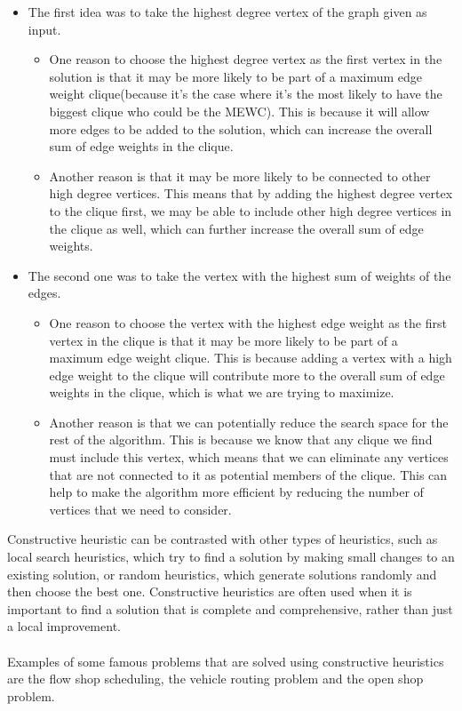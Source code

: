     \begin{itemize}
        \item The first idea was to take the highest degree vertex of the graph given as input. 
        \begin{itemize}
            \item One reason to choose the highest degree vertex as the first vertex in the solution is that it may be more likely to be part of a maximum edge weight clique(because it's the case where it's the most likely to have the biggest clique who could be the MEWC). This is because it will allow more edges to be added to the solution, which can increase the overall sum of edge weights in the clique.
            \item Another reason is that it may be more likely to be connected to other high degree vertices. This means that by adding the highest degree vertex to the clique first, we may be able to include other high degree vertices in the clique as well, which can further increase the overall sum of edge weights.
        \end{itemize}
        \item The second one was to take the vertex with the highest sum of weights of the edges.
        \begin{itemize}
            \item One reason to choose the vertex with the highest edge weight as the first vertex in the clique is that it may be more likely to be part of a maximum edge weight clique. This is because adding a vertex with a high edge weight to the clique will contribute more to the overall sum of edge weights in the clique, which is what we are trying to maximize.
            \item Another reason is that we can potentially reduce the search space for the rest of the algorithm. This is because we know that any clique we find must include this vertex, which means that we can eliminate any vertices that are not connected to it as potential members of the clique. This can help to make the algorithm more efficient by reducing the number of vertices that we need to consider.
        \end{itemize}
    \end{itemize}



    Constructive heuristic can be contrasted with other types of heuristics, such as local search heuristics, which try to find a solution by making small changes to an existing solution, or random heuristics, which generate solutions randomly and then choose the best one. Constructive heuristics are often used when it is important to find a solution that is complete and comprehensive, rather than just a local improvement.
    \\ \\
    Examples of some famous problems that are solved using constructive heuristics are the flow shop scheduling, the vehicle routing problem and the open shop problem.
    \\ \\
    